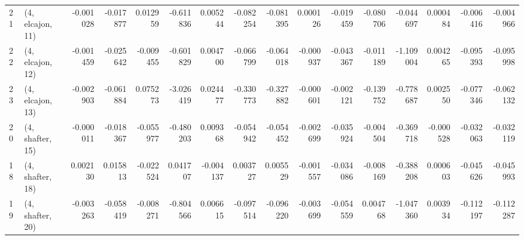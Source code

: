 \begin{tabular}{llrrrrrrrrrrrrrr}
21 &  (4, elcajon, 11) &  -0.001028 & -0.017877 &  0.012959 &  -0.611836 &  0.005244 &  -0.082254 & -0.081395 &  0.000126 & -0.019459 & -0.080706 &  -0.044697 &  0.000484 & -0.006416 & -0.004966 \\
22 &  (4, elcajon, 12) &  -0.001459 & -0.025642 & -0.009455 &  -0.601829 &  0.004700 &  -0.066799 & -0.064018 & -0.000937 & -0.043367 & -0.011189 &  -1.109004 &  0.004265 & -0.095393 & -0.095998 \\
23 &  (4, elcajon, 13) &  -0.002903 & -0.061884 &  0.075273 &  -3.026419 &  0.024477 &  -0.330773 & -0.327882 & -0.000601 & -0.002121 & -0.139752 &  -0.778687 &  0.002550 & -0.077346 & -0.062132 \\
20 &  (4, shafter, 15) &  -0.000011 & -0.018367 & -0.055977 &  -0.480203 &  0.009368 &  -0.054942 & -0.054452 & -0.002699 & -0.035924 & -0.004504 &  -0.369718 & -0.000528 & -0.032063 & -0.032119 \\
18 &  (4, shafter, 18) &   0.002130 &  0.015813 & -0.022524 &   0.041707 & -0.004137 &   0.003727 &  0.005529 & -0.001557 & -0.034086 & -0.008169 &  -0.388208 &  0.000603 & -0.045626 & -0.045993 \\
19 &  (4, shafter, 20) &  -0.003263 & -0.058419 & -0.008271 &  -0.804566 &  0.006615 &  -0.097514 & -0.096220 & -0.003699 & -0.054559 &  0.004768 &  -1.047360 &  0.003934 & -0.112197 & -0.112287 \\
\bottomrule
\end{tabular}
